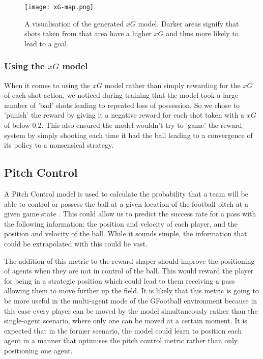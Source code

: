 \documentclass[11pt]{article}
\begin{document}
\begin{figure}[!h]
    \centering
    \texttt{[image: xG-map.png]}
    \caption{A visualisation of the generated $xG$ model. Darker areas signify that shots taken from that area have a higher $xG$ and thus more likely to lead to a goal.}
    \label{fig:xG-map}
\end{figure}

\subsubsection{Using the $xG$ model}
When it comes to using the $xG$ model rather than simply rewarding for the $xG$ of each shot action, we noticed during training that the model took a large number of 'bad' shots leading to repeated loss of possession. So we chose to 'punish' the reward by giving it a negative reward for each shot taken with a  $xG$ of below 0.2. This also ensured the model wouldn't try to 'game' the reward system by simply shooting each time it had the ball leading to a convergence of its policy to a nonsensical strategy.

\subsection{Pitch Control}

A Pitch Control model is used to calculate the probability that a team will be able to control or possess the ball at a given location of the football pitch at a given game state \cite{Spearman2016}. This could allow us to predict the success rate for a pass \cite{Higgins2023} with the following information: the position and velocity of each player, and the position and velocity of the ball. While it sounds simple, the information that could be extrapolated with this could be vast.

The addition of this metric to the reward shaper should improve the positioning of agents when they are not in control of the ball. This would reward the player for being in a strategic position which could lead to them receiving a pass allowing them to move further up the field. It is likely that this metric is going to be more useful in the multi-agent mode of the GFootball environment because in this case every player can be moved by the model simultaneously rather than the single-agent scenario, where only one can be moved at a certain moment. It is expected that in the former scenario, the model could learn to position each agent in a manner that optimises the pitch control metric rather than only positioning one agent.
\end{document}
